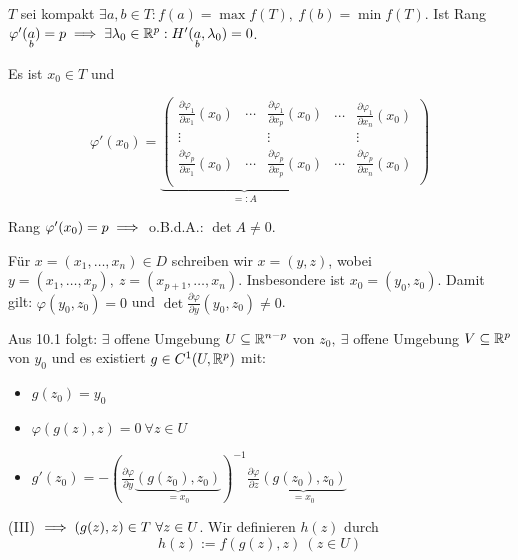 \documentclass[a4paper,oneside,DIV15,BCOR12mm,chapterprefix=true,headings=onelinechapter]{scrbook}
\begin{document}
\begin{folgerung}
$T$ sei kompakt  $\exists a,b \in T: f(a) = \max f(T),\ f(b) = \min f(T).$ 
Ist Rang $\varphi'(\underset{b}{a}) = p \implies \exists \lambda_0 \in \mathbb{R}^p: H'(\underset{b}{a},\lambda_0) = 0$.
\end{folgerung}

\begin{beweis}
Es ist $x_0 \in T$ und

$$\varphi'(x_0) = 
\underbrace{
\left(
\begin{array}{ccc|}
\frac{\partial \varphi_1}{\partial x_1}(x_0) & \cdots & \frac{\partial \varphi_1}{\partial x_p}(x_0)\\
\vdots &  & \vdots\\
\frac{\partial \varphi_p}{\partial x_1}(x_0) & \cdots & \frac{\partial \varphi_p}{\partial x_p}(x_0)\\
\end{array}
\right.
}_{=:A}
\left.
\begin{array}{cc}
\cdots & \frac{\partial \varphi_1}{\partial x_n}(x_0)\\
 & \vdots\\
\cdots & \frac{\partial \varphi_p}{\partial x_n}(x_0)\\
\end{array}
\right)$$

Rang $\varphi'(x_0) = p \implies$ o.B.d.A.: $\det A \ne 0.$

Für $x=(x_1,\ldots,x_n) \in D$ schreiben wir $x=(y,z)$, wobei $y=(x_1,\dots,x_p),\ z=(x_{p+1},\ldots,x_n).$ Insbesondere ist $x_0=(y_0,z_0)$. Damit gilt: $\varphi(y_0,z_0) = 0$ und $\det \frac{\partial \varphi}{\partial y}(y_0,z_0) \ne 0$.

Aus 10.1 folgt: $\exists$ offene Umgebung $U \subseteq \mathbb{R}^{n-p}$ von $z_0,\ \exists$ offene Umgebung $V \subseteq \mathbb{R}^p$ von $y_0$ und es existiert $g \in C^1(U,\mathbb{R}^p)$ mit:

\begin{itemize}
\item[(II)] $g(z_0)=y_0$
\item[(III)] $\varphi(g(z),z) = 0\ \forall z \in U$
\item[(IV)] $g'(z_0) = -(\frac{\partial \varphi}{\partial y}\underbrace{(g(z_0),z_0)}_{=x_0})^{-1}\frac{\partial \varphi}{\partial z}\underbrace{(g(z_0),z_0)}_{=x_0}$
\end{itemize}

(III) $\implies (g(z),z) \in T\ \forall z \in U$. Wir definieren $h(z)$ durch
$$h(z) := f(g(z),z)\ (z \in U)$$


\end{beweis}
\end{document}
